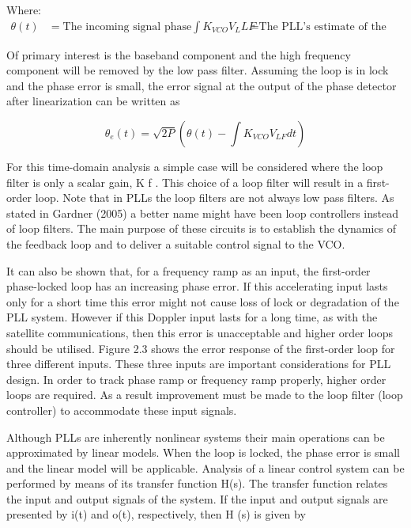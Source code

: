 Where:
\begin{align*}
\theta(t) &= \text{The incoming signal phase}
\int K_{VCO}V_L{LF} &= \text{The PLL's estimate of the
phase.}
\end{align*}


Of primary interest is the baseband component and the high frequency component will be removed by the low pass filter. Assuming the loop is in lock and the phase error is small, the error signal at the output of the phase detector after linearization can be written as

\begin{equation}
	\theta_e(t) = \sqrt{2P}(\theta(t) - \int K_{VCO} V_{LF} dt)  
\end{equation}


For this time-domain analysis a simple case will be considered where the loop filter is only a scalar gain, K f . This choice of a loop filter will result in a first-order loop. Note
that in PLLs the loop filters are not always low pass filters. As stated in Gardner (2005) a better name might have been loop controllers instead of loop filters. The main purpose of these circuits is to establish the dynamics of the feedback loop and to deliver a suitable control signal to the VCO.


It can also be shown that, for a frequency ramp as an input, the first-order phase-locked loop has an increasing phase error. If this accelerating input lasts only for a short time this error might not cause loss of lock or degradation of the PLL system. However if this Doppler input lasts for a long time, as with the satellite communications, then this error is unacceptable and higher order loops should be utilised. Figure 2.3 shows the error response of the first-order loop for three different inputs. These three inputs are important considerations for PLL design. In order to track phase ramp or frequency ramp properly, higher order loops are required. As a result improvement must be made to the loop filter
(loop controller) to accommodate these input signals.

Although PLLs are inherently nonlinear systems their main operations can be approximated by linear models. When the loop is locked, the phase error is small and the linear model will be applicable. Analysis of a linear control system can be performed by means of its transfer function H(s). The transfer function relates the input and output
signals of the system. If the input and output signals are presented by i(t) and o(t), respectively, then H (s) is given by


